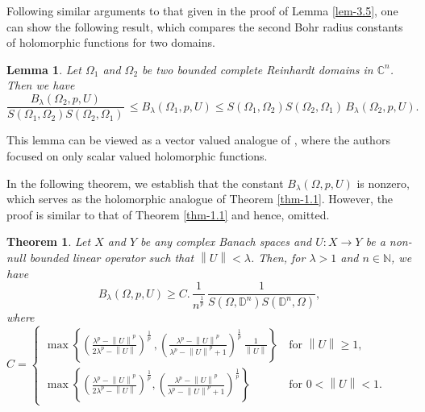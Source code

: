 \documentclass[a4paper,11pt, reqno]{amsart}
\newtheorem{thm}{Theorem}[section]
\newtheorem{lem}{Lemma}[section]
\theoremstyle{definition}
\newcommand{\real}{{\operatorname{Re}\,}}
\newcommand{\norm}[1]{\left\lVert#1\right\rVert}
\begin{document}
Following similar arguments to that given in the proof of Lemma \ref{lem-3.5}, one can show the following result, which compares the second Bohr radius constants of holomorphic functions for two domains. %
\begin{lem} \label{lem-3.5-a}
	Let $\Omega_{1}$ and $\Omega_{2}$ be two bounded complete Reinhardt domains in $\mathbb{C}^n$. Then we have $$\frac{B_{\lambda}(\Omega_{2}, p,U)}{S(\Omega_{1},\Omega_{2})S(\Omega_{2},\Omega_{1})} \, \leq B_{\lambda}(\Omega_{1}, p,U) \leq S(\Omega_{1},\Omega_{2})S(\Omega_{2},\Omega_{1}) \, B_{\lambda}(\Omega_{2}, p,U).
	$$
\end{lem}
This lemma can be viewed as a vector valued analogue of \cite[Lemma 3.1]{defant-2004}, where the authors focused on only scalar valued holomorphic functions.
\par
In the following theorem, we establish that the constant $B_{\lambda}(\Omega, p, U)$ is nonzero, which serves as the holomorphic analogue of Theorem \ref{thm-1.1}. However, the proof is similar to that of Theorem \ref{thm-1.1} and hence, omitted.
\begin{thm} \label{thm-1.1-a}
	Let $X$ and $Y$ be any complex Banach spaces and $U: X \rightarrow Y$ be a non-null bounded linear operator such that $\norm{U}< \lambda$. Then, for $\lambda>1$ and $n \in \mathbb{N}$, we have
	$$
	B_{\lambda}(\Omega, p,U) \geq  C.\,\frac{1}{n^{\frac{1}{p}}}\,\frac{1}{S(\Omega,\mathbb{D}^n)S(\mathbb{D}^n,\Omega)},$$
	where 
	$	C=\begin{cases}
		\max \left\{\left(\frac{\lambda^p - \norm{U}^p}{2\lambda^p - \norm{U}}\right)^{\frac{1}{p}}\, , \left(\frac{\lambda^p - \norm{U}^p}{\lambda^p - \norm{U}^p +1}\right)^{\frac{1}{p}}\, \frac{1}{\norm{U}}\right\}\,  & \text{for $\norm{U}\geq 1$},\\[3mm]
		\max \left\{\left(\frac{\lambda^p - \norm{U}^p}{2\lambda^p - \norm{U}}\right)^{\frac{1}{p}}, \left(\frac{\lambda^p - \norm{U}^p}{\lambda^p - \norm{U}^p +1}\right)^{\frac{1}{p}}\right\} & \text{for $0<\norm{U}< 1$}.
	\end{cases}
	$
\end{thm}
\end{document}
